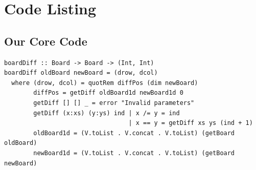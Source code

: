 \documentclass[twoside,11pt]{homework}
\begin{document}
\section{Code Listing}
\subsection{Our Core Code}
\begin{verbatim}
boardDiff :: Board -> Board -> (Int, Int)
boardDiff oldBoard newBoard = (drow, dcol) 
  where (drow, dcol) = quotRem diffPos (dim newBoard)
        diffPos = getDiff oldBoard1d newBoard1d 0
        getDiff [] [] _ = error "Invalid parameters"
        getDiff (x:xs) (y:ys) ind | x /= y = ind
                                  | x == y = getDiff xs ys (ind + 1)
        oldBoard1d = (V.toList . V.concat . V.toList) (getBoard oldBoard)
        newBoard1d = (V.toList . V.concat . V.toList) (getBoard newBoard)
\end{verbatim}

\printbibliography %
\end{document}
